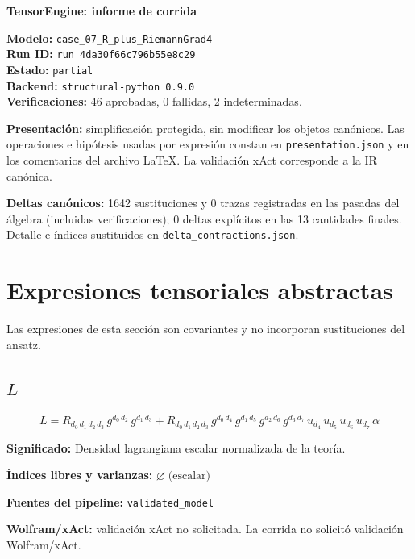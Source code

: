 \documentclass[11pt]{article}
\begin{document}
\begin{center}
{\Large\bfseries TensorEngine: informe de corrida}
\end{center}
\textbf{Modelo:} \texttt{case\_07\_R\_plus\_RiemannGrad4}\\
\textbf{Run ID:} \texttt{run\_4da30f66c796b55e8c29}\\
\textbf{Estado:} \texttt{partial}\\
\textbf{Backend:} \texttt{structural-python 0.9.0}\\
\textbf{Verificaciones:} 46 aprobadas, 0 fallidas, 2 indeterminadas.
\par\smallskip
\textbf{Presentación:} simplificación protegida, sin modificar los objetos canónicos. Las operaciones e hipótesis usadas por expresión constan en \texttt{presentation.json} y en los comentarios del archivo LaTeX. La validación xAct corresponde a la IR canónica.\par
\textbf{Deltas canónicos:} 1642 sustituciones y 0 trazas registradas en las pasadas del álgebra (incluidas verificaciones); 0 deltas explícitos en las 13 cantidades finales. Detalle e índices sustituidos en \texttt{delta\_contractions.json}.\par
\section*{Expresiones tensoriales abstractas}
Las expresiones de esta sección son covariantes y no incorporan sustituciones del ansatz.
\subsection*{$ L $}
\begin{dmath*}[breakdepth={5}]
L = R{}_{d_{0}\,d_{1}\,d_{2}\,d_{3}}\,g{}^{d_{0}\,d_{2}}\,g{}^{d_{1}\,d_{3}} + R{}_{d_{0}\,d_{1}\,d_{2}\,d_{3}}\,g{}^{d_{0}\,d_{4}}\,g{}^{d_{1}\,d_{5}}\,g{}^{d_{2}\,d_{6}}\,g{}^{d_{3}\,d_{7}}\,u{}_{d_{4}}\,u{}_{d_{5}}\,u{}_{d_{6}}\,u{}_{d_{7}}\,\alpha
\end{dmath*}
\par\vspace{1.2\baselineskip}\noindent
\begin{minipage}{\linewidth}
\textbf{Significado:} Densidad lagrangiana escalar normalizada de la teoría.\par
\textbf{Índices libres y varianzas:} $ \varnothing\;\text{(escalar)} $\par
\textbf{Fuentes del pipeline:} \texttt{validated\_model}\par
\textbf{Wolfram/xAct:} validación xAct no solicitada. La corrida no solicitó validación Wolfram/xAct.\par
\end{minipage}
\end{document}

